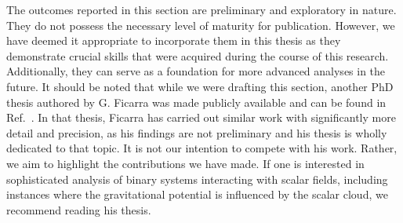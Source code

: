 The outcomes reported in this section are preliminary and exploratory in nature. They do not possess the necessary level of maturity for publication. However, we have deemed it appropriate to incorporate them in this thesis as they demonstrate crucial skills that were acquired during the course of this research. Additionally, they can serve as a foundation for more advanced analyses in the future. It should be noted that while we were drafting this section, another PhD thesis authored by G. Ficarra was made publicly available and can be found in Ref.~\cite{Ficarra2023}. In that thesis, Ficarra has carried out similar work with significantly more detail and precision, as his findings are not preliminary and his thesis is wholly dedicated to that topic. It is not our intention to compete with his work. Rather, we aim to highlight the contributions we have made. If one is interested in sophisticated analysis of binary systems interacting with scalar fields, including instances where the gravitational potential is influenced by the scalar cloud, we recommend reading his thesis.